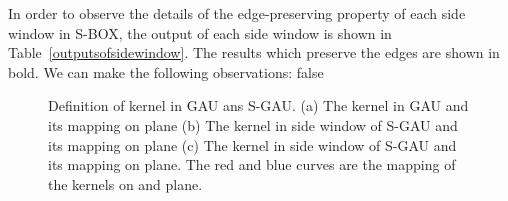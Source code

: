 \documentclass[10pt,twocolumn,letterpaper]{article}
\begin{document}
In order to observe the details of the edge-preserving property of each side window in S-BOX, the output of each side window is shown in Table~\ref{outputsofsidewindow}. The results which preserve the edges are shown in bold. We can make the following observations: \if false
\begin{figure}[h]
	\centering
	\caption{Definition of kernel in GAU ans S-GAU. (a) The kernel in GAU and its mapping on  plane (b) The kernel in  side window of S-GAU and its mapping on  plane (c) The kernel in  side window of S-GAU and its mapping on  plane. The red and blue curves are the mapping of the kernels on  and  plane.}
	\label{sgau}
\end{figure}
\fi
\end{document}
